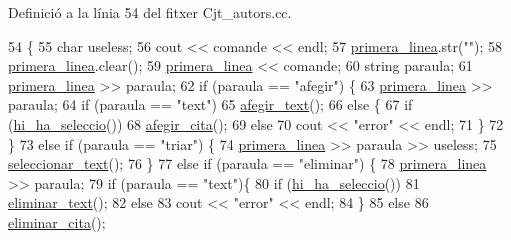 Definició a la línia 54 del fitxer Cjt\+\_\+autors.\+cc.


\begin{DoxyCode}
54                                        \{
55     \textcolor{keywordtype}{char} useless;
56     cout << comande << endl;
57     \hyperlink{class_cjt__autors_a833753dc5eaa466591f7dce971e5021c}{primera\_linea}.str(\textcolor{stringliteral}{""});
58     \hyperlink{class_cjt__autors_a833753dc5eaa466591f7dce971e5021c}{primera\_linea}.clear();
59     \hyperlink{class_cjt__autors_a833753dc5eaa466591f7dce971e5021c}{primera\_linea} << comande;
60     \textcolor{keywordtype}{string} paraula;
61     \hyperlink{class_cjt__autors_a833753dc5eaa466591f7dce971e5021c}{primera\_linea} >> paraula;
62     \textcolor{keywordflow}{if} (paraula == \textcolor{stringliteral}{"afegir"}) \{
63         \hyperlink{class_cjt__autors_a833753dc5eaa466591f7dce971e5021c}{primera\_linea} >> paraula;
64         \textcolor{keywordflow}{if} (paraula == \textcolor{stringliteral}{"text"})
65             \hyperlink{class_cjt__autors_aec38f4dac32347c8b320bbf4aa204b5b}{afegir\_text}();
66         \textcolor{keywordflow}{else} \{
67             \textcolor{keywordflow}{if} (\hyperlink{class_cjt__autors_a60adf6ed96d0c69487bd7e9de6aa7e1d}{hi\_ha\_seleccio}())
68                 \hyperlink{class_cjt__autors_a2c0fec1160c25fd7d458ff0b62f250ff}{afegir\_cita}();
69             \textcolor{keywordflow}{else}
70                 cout << \textcolor{stringliteral}{"error"} << endl;
71         \}
72     \}
73     \textcolor{keywordflow}{else} \textcolor{keywordflow}{if} (paraula == \textcolor{stringliteral}{"triar"}) \{
74         \hyperlink{class_cjt__autors_a833753dc5eaa466591f7dce971e5021c}{primera\_linea} >> paraula >> useless;
75         \hyperlink{class_cjt__autors_a5b975fe803a82fe99de5e92e32bcd681}{seleccionar\_text}();
76     \}
77     \textcolor{keywordflow}{else} \textcolor{keywordflow}{if} (paraula == \textcolor{stringliteral}{"eliminar"}) \{
78         \hyperlink{class_cjt__autors_a833753dc5eaa466591f7dce971e5021c}{primera\_linea} >> paraula;
79         \textcolor{keywordflow}{if} (paraula == \textcolor{stringliteral}{"text"})\{
80             \textcolor{keywordflow}{if} (\hyperlink{class_cjt__autors_a60adf6ed96d0c69487bd7e9de6aa7e1d}{hi\_ha\_seleccio}())
81                 \hyperlink{class_cjt__autors_a171709e9426f62ecdcd1eba359965028}{eliminar\_text}();
82             \textcolor{keywordflow}{else}
83                 cout << \textcolor{stringliteral}{"error"} << endl;
84         \}
85         \textcolor{keywordflow}{else}
86             \hyperlink{class_cjt__autors_a5811a00943aea93a50098d7c2053b9a8}{eliminar\_cita}();

\end{DoxyCode}
